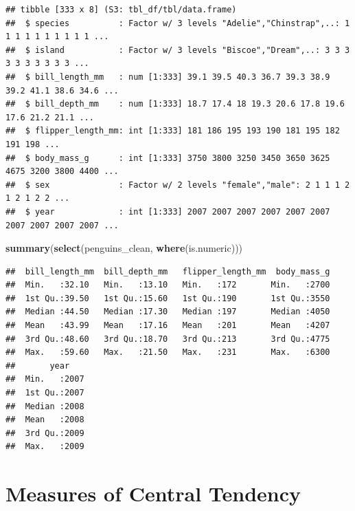 \documentclass[
]{book}
\newenvironment{Shaded}{\begin{snugshade}}{\end{snugshade}}
\newcommand{\FunctionTok}[1]{\textcolor[rgb]{0.13,0.29,0.53}{\textbf{#1}}}
\newcommand{\NormalTok}[1]{#1}
\newcommand{\OtherTok}[1]{\textcolor[rgb]{0.56,0.35,0.01}{#1}}
\newcommand{\SpecialCharTok}[1]{\textcolor[rgb]{0.81,0.36,0.00}{\textbf{#1}}}
\begin{document}
\begin{verbatim}
## tibble [333 x 8] (S3: tbl_df/tbl/data.frame)
##  $ species          : Factor w/ 3 levels "Adelie","Chinstrap",..: 1 1 1 1 1 1 1 1 1 1 ...
##  $ island           : Factor w/ 3 levels "Biscoe","Dream",..: 3 3 3 3 3 3 3 3 3 3 ...
##  $ bill_length_mm   : num [1:333] 39.1 39.5 40.3 36.7 39.3 38.9 39.2 41.1 38.6 34.6 ...
##  $ bill_depth_mm    : num [1:333] 18.7 17.4 18 19.3 20.6 17.8 19.6 17.6 21.2 21.1 ...
##  $ flipper_length_mm: int [1:333] 181 186 195 193 190 181 195 182 191 198 ...
##  $ body_mass_g      : int [1:333] 3750 3800 3250 3450 3650 3625 4675 3200 3800 4400 ...
##  $ sex              : Factor w/ 2 levels "female","male": 2 1 1 1 2 1 2 1 2 2 ...
##  $ year             : int [1:333] 2007 2007 2007 2007 2007 2007 2007 2007 2007 2007 ...
\end{verbatim}

\begin{Shaded}
\begin{Highlighting}[]
\FunctionTok{summary}\NormalTok{(}\FunctionTok{select}\NormalTok{(penguins\_clean, }\FunctionTok{where}\NormalTok{(is.numeric)))}
\end{Highlighting}
\end{Shaded}

\begin{verbatim}
##  bill_length_mm  bill_depth_mm   flipper_length_mm  body_mass_g  
##  Min.   :32.10   Min.   :13.10   Min.   :172       Min.   :2700  
##  1st Qu.:39.50   1st Qu.:15.60   1st Qu.:190       1st Qu.:3550  
##  Median :44.50   Median :17.30   Median :197       Median :4050  
##  Mean   :43.99   Mean   :17.16   Mean   :201       Mean   :4207  
##  3rd Qu.:48.60   3rd Qu.:18.70   3rd Qu.:213       3rd Qu.:4775  
##  Max.   :59.60   Max.   :21.50   Max.   :231       Max.   :6300  
##       year     
##  Min.   :2007  
##  1st Qu.:2007  
##  Median :2008  
##  Mean   :2008  
##  3rd Qu.:2009  
##  Max.   :2009
\end{verbatim}

\hypertarget{measures-of-central-tendency}{%
\section{Measures of Central Tendency}\label{measures-of-central-tendency}}

\begin{Shaded}
\end{Shaded}
\end{document}
